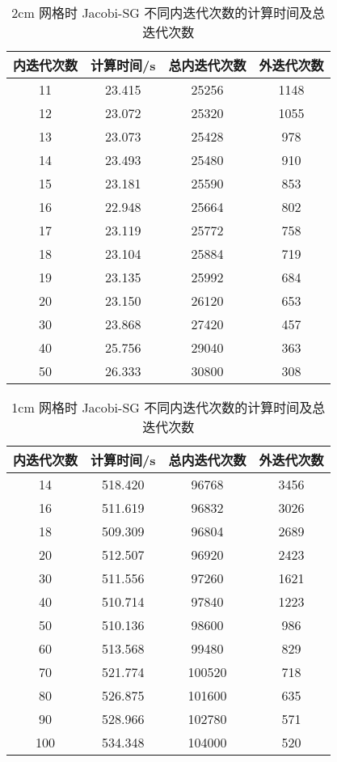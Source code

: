 \begin{datasheet}
\begin{table}
\centering
\caption{2cm 网格时 Jacobi-SG 不同内迭代次数的计算时间及总迭代次数}
\label{tab:equsolve.iter.jacobi-sg.2cm}
\begin{tabular}{cccc}
\toprule
内迭代次数 & 计算时间/s & 总内迭代次数 & 外迭代次数\\
\midrule
11 & 23.415 & 25256 & 1148\\
12 & 23.072 & 25320 & 1055\\
13 & 23.073 & 25428 & 978\\
14 & 23.493 & 25480 & 910\\
15 & 23.181 & 25590 & 853\\
16 & 22.948 & 25664 & 802\\
17 & 23.119 & 25772 & 758\\
18 & 23.104 & 25884 & 719\\
19 & 23.135 & 25992 & 684\\
20 & 23.150 & 26120 & 653\\
30 & 23.868 & 27420 & 457\\
40 & 25.756 & 29040 & 363\\
50 & 26.333 & 30800 & 308\\
\bottomrule
\end{tabular}
\end{table}


\begin{table}
\centering
\caption{1cm 网格时 Jacobi-SG 不同内迭代次数的计算时间及总迭代次数}
\label{tab:equsolve.iter.jacobi-sg.1cm}
\begin{tabular}{cccc}
\toprule
内迭代次数 & 计算时间/s & 总内迭代次数 & 外迭代次数\\
\midrule
14 & 518.420 & 96768 & 3456\\
16 & 511.619 & 96832 & 3026\\
18 & 509.309 & 96804 & 2689\\
20 & 512.507 & 96920 & 2423\\
30 & 511.556 & 97260 & 1621\\
40 & 510.714 & 97840 & 1223\\
50 & 510.136 & 98600 & 986\\
60 & 513.568 & 99480 & 829\\
70 & 521.774 & 100520 & 718\\
80 & 526.875 & 101600 & 635\\
90 & 528.966 & 102780 & 571\\
100 & 534.348 & 104000 & 520\\
\bottomrule
\end{tabular}
\end{table}

\end{datasheet}


